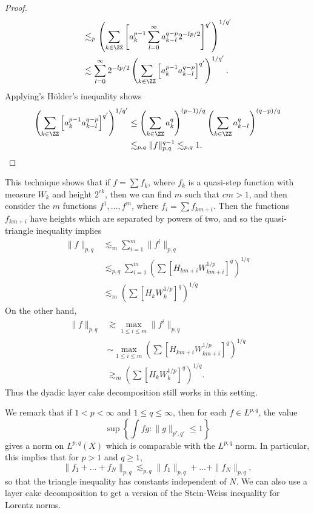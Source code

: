 \begin{proof}
\begin{align*}
        &\lesssim_p \left( \sum_{k \in \ZZ} \left[ a_k^{p-1} \sum_{l = 0}^\infty a_{k-l}^{q-p} 2^{-lp/2} \right]^{q'} \right)^{1/q'}\\
        &\lesssim \sum_{l = 0}^\infty 2^{-lp/2} \left( \sum_{k \in \ZZ} \left[ a_k^{p-1} a_{k-l}^{q-p} \right]^{q'} \right)^{1/q'}.
    \end{align*}
    Applying's H\"{o}lder's inequality shows
    \begin{align*}
        \left( \sum_{k \in \ZZ} \left[ a_k^{p-1} a_{k-l}^{q-p} \right]^{q'} \right)^{1/q'} &\leq  \left( \sum_{k \in \ZZ} a_k^q \right)^{(p-1)/q} \left( \sum_{k \in \ZZ} a_{k-l}^q \right)^{(q-p)/q}\\
        &\lesssim_{p,q} \| f \|_{p,q}^{q-1} \lesssim_{p,q} 1. \qedhere
    \end{align*}
\end{proof}

\begin{remark}
    This technique shows that if $f = \sum f_k$, where $f_k$ is a quasi-step function with measure $W_k$ and height $2^{ck}$, then we can find $m$ such that $cm > 1$, and then consider the $m$ functions $f^1, \dots, f^m$, where $f_i = \sum f_{km + i}$. Then the functions $f_{km + i}$ have heights which are separated by powers of two, and so the quasi-triangle inequality implies
    \begin{align*}
        \| f \|_{p,q} &\lesssim_m \sum_{i = 1}^m \| f^i \|_{p,q}\\
        &\lesssim_{p,q} \sum_{i = 1}^m \left( \sum \left[ H_{km + i} W_{km + i}^{1/p} \right]^q \right)^{1/q}\\
        &\lesssim_m \left( \sum \left[ H_k W_k^{1/p} \right]^q \right)^{1/q}
    \end{align*}
    On the other hand,
    \begin{align*}
        \| f \|_{p,q} &\gtrsim \max_{1 \leq i \leq m} \| f^i \|_{p,q}\\
        &\sim \max_{1 \leq i \leq m} \left( \sum \left[ H_{km + i} W_{km + i}^{1/p} \right]^q \right)^{1/q}\\
        &\gtrsim_m \left( \sum \left[ H_k W_k^{1/p} \right]^q \right)^{1/q}.
    \end{align*}
    Thus the dyadic layer cake decomposition still works in this setting.
\end{remark}

We remark that if $1 < p < \infty$ and $1 \leq q \leq \infty$, then for each $f \in L^{p,q}$, the value
%
\[ \sup \left\{ \int fg : \| g \|_{p',q'} \leq 1 \right\} \]
%
gives a norm on $L^{p,q}(X)$ which is comparable with the $L^{p,q}$ norm. In particular, this implies that for $p > 1$ and $q \geq 1$,
%
\[ \| f_1 + \dots + f_N \|_{p,q} \lesssim_{p,q} \| f_1 \|_{p,q} + \dots + \| f_N \|_{p,q}, \]
%
so that the triangle inequality has constants independent of $N$. We can also use a layer cake decomposition to get a version of the Stein-Weiss inequality for Lorentz norms.

